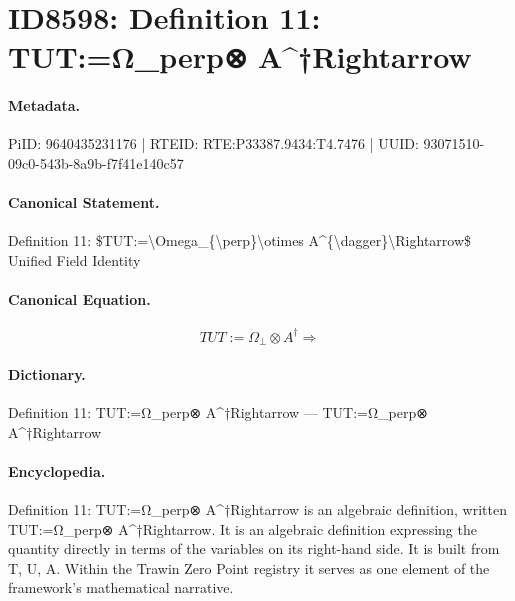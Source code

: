 \section*{ID8598: Definition 11: TUT:=Ω\_perp⊗ A\textasciicircum{}†Rightarrow}
\paragraph{Metadata.}
PiID: 9640435231176 | RTEID: RTE:P33387.9434:T4.7476 | UUID: 93071510-09c0-543b-8a9b-f7f41e140c57

\paragraph{Canonical Statement.}
Definition 11: \$TUT:=\textbackslash{}Omega\_\{\textbackslash{}perp\}\textbackslash{}otimes A\textasciicircum{}\{\textbackslash{}dagger\}\textbackslash{}Rightarrow\$ Unified Field Identity

\paragraph{Canonical Equation.}
\[
TUT:=\Omega_{\perp}\otimes A^{\dagger}\Rightarrow
\]

\paragraph{Dictionary.}
Definition 11: TUT:=Ω\_perp⊗ A\textasciicircum{}†Rightarrow — TUT:=Ω\_perp⊗ A\textasciicircum{}†Rightarrow

\paragraph{Encyclopedia.}
Definition 11: TUT:=Ω\_perp⊗ A\textasciicircum{}†Rightarrow is an algebraic definition, written TUT:=Ω\_perp⊗ A\textasciicircum{}†Rightarrow. It is an algebraic definition expressing the quantity directly in terms of the variables on its right-hand side. It is built from T, U, A. Within the Trawin Zero Point registry it serves as one element of the framework's mathematical narrative.

